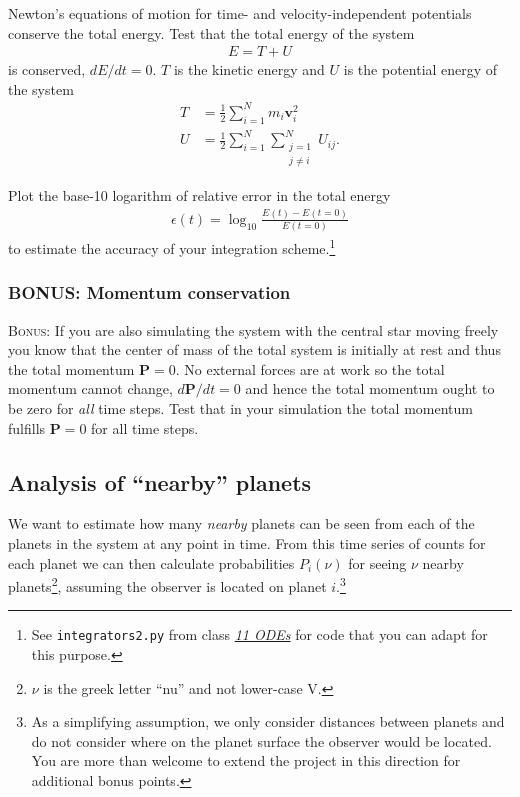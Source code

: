 \documentclass[letterpaper]{scrartcl}
\newcommand{\BONUS}{\textsc{Bonus: }}
\renewcommand{\vec}[1]{\ensuremath{\mathbf{#1}}}
\begin{document}
Newton's equations of motion for time- and velocity-independent
potentials conserve the total energy. Test that the total energy of
the system
\begin{gather}
  \label{eq:energy}
  E = T + U
\end{gather}
is conserved, $dE/dt = 0$. $T$ is the kinetic energy and $U$ is the
potential energy of the system
\begin{align}
  \label{eq:KE}
  T &= \frac{1}{2} \sum_{i=1}^{N} m_{i} \vec{v}_{i}^{2}\\
  \label{eq:PE}
  U &= \frac{1}{2}\sum_{i=1}^{N}\sum_{\substack{j=1\\j \neq i}}^{N} U_{ij}.
\end{align}

Plot the base-10 logarithm of relative error in the total energy 
\begin{gather}
  \label{eq:energyaccuracy}
  \epsilon(t) = \log_{10} \frac{E(t) - E(t=0)}{E(t=0)} 
\end{gather}
to estimate the accuracy of your integration scheme.\footnote{See
  \texttt{integrators2.py} from class
  \emph{\href{http://asu-compmethodsphysics-phy494.github.io/ASU-PHY494//2017/02/16/11_ODEs/}{11
      ODEs}} for code that you can adapt for this purpose.}

\subsubsection{BONUS: Momentum conservation}
\label{sec:momentum}

\BONUS If you are also simulating the system with the central star
moving freely you know that the center of mass of the total system is
initially at rest and thus the total momentum $\vec{P}=0$. No external
forces are at work so the total momentum cannot change,
$d\vec{P}/dt = 0$ and hence the total momentum ought to be zero for
\emph{all} time steps. Test that in your simulation the total momentum
fulfills $\vec{P} = 0$ for all time steps.


\subsection{Analysis of ``nearby'' planets}
\label{sec:nearby}

We want to estimate how many \emph{nearby} planets can be seen from
each of the planets in the system at any point in time. From this time
series of counts for each planet we can then calculate probabilities
$P_{i}(\nu)$ for seeing $\nu$ nearby planets\footnote{$\nu$ is the
  greek letter ``nu'' and not lower-case V.}, assuming the observer is
located on planet $i$.\footnote{As a simplifying assumption, we only
  consider distances between planets and do not consider where on the
  planet surface the observer would be located. You are more than
  welcome to extend the project in this direction for additional bonus
  points.}
\end{document}
